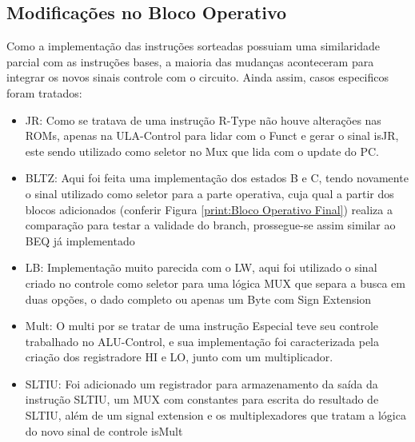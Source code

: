 \documentclass{report}
\begin{document}
        \subsection{Modificações no Bloco Operativo}
        Como a implementação das instruções sorteadas possuiam uma similaridade parcial com as instruções bases, a maioria das mudanças aconteceram para integrar os novos sinais controle com o circuito.
        Ainda assim, casos especificos foram tratados:
            \begin{itemize}    
            \item JR: Como se tratava de uma instrução R-Type não houve alterações nas ROMs, apenas na ULA-Control para lidar com o Funct e gerar o sinal isJR, este sendo utilizado como seletor no Mux que lida com o update do PC.
            \item BLTZ: Aqui foi feita uma implementação dos estados B e C, tendo novamente o sinal utilizado como seletor para a parte operativa, cuja qual a partir dos blocos adicionados (conferir Figura \ref{print:Bloco Operativo Final}) realiza a comparação para testar a validade do branch, prossegue-se assim similar ao BEQ já implementado 
            \item LB: Implementação muito parecida com o LW, aqui foi utilizado o sinal criado no controle como seletor para uma lógica MUX que separa a busca em duas opções, o dado completo ou apenas um Byte com Sign Extension
            \item Mult: O multi por se tratar de uma instrução Especial teve seu controle trabalhado no ALU-Control, e sua implementação foi caracterizada pela criação dos registradore HI e LO, junto com um multiplicador. 
            \item SLTIU: Foi adicionado um registrador para armazenamento da saída da instrução SLTIU, um MUX com constantes para escrita do resultado de SLTIU, além de um signal extension e os multiplexadores que tratam a lógica do novo sinal de controle isMult
            \end{itemize}
\end{document}
